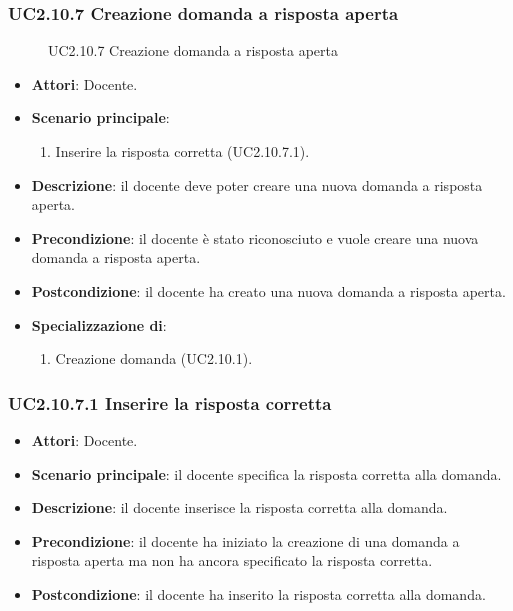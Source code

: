 \subsubsection{UC2.10.7 Creazione domanda a risposta aperta}
\begin{figure}[H]
\centering
\noindent{}
\caption{UC2.10.7 Creazione domanda a risposta aperta}
\end{figure}
\begin{itemize}
\item \textbf{Attori}: Docente.
\item \textbf{Scenario principale}:
\begin{enumerate}
\item Inserire la risposta corretta (UC2.10.7.1).
\end{enumerate}
\item \textbf{Descrizione}: il docente deve poter creare una nuova domanda a risposta aperta.
\item \textbf{Precondizione}: il docente è stato riconosciuto e vuole creare una nuova domanda a risposta aperta.
\item \textbf{Postcondizione}: il docente ha creato una nuova domanda a risposta aperta.
\item \textbf{Specializzazione di}:
\begin{enumerate}
\item Creazione domanda (UC2.10.1).
\end{enumerate}
\end{itemize}
\subsubsection{UC2.10.7.1 Inserire la risposta corretta}
\begin{itemize}
\item \textbf{Attori}: Docente.
\item \textbf{Scenario principale}: il docente specifica la risposta corretta alla domanda.
\item \textbf{Descrizione}: il docente inserisce la risposta corretta alla domanda.
\item \textbf{Precondizione}: il docente ha iniziato la creazione di una domanda a risposta aperta ma non ha ancora specificato la risposta corretta.
\item \textbf{Postcondizione}: il docente ha inserito la risposta corretta alla domanda.
\end{itemize}
